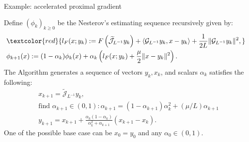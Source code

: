 \documentclass[11pt]{beamer}
\begin{document}
        \begin{frame}{Example: accelerated proximal gradient}
            \begin{definition}
                \label{def:nes-est-seq-pg}
                {\small
                    Define $(\phi_k)_{k \ge0}$ be the Nesterov's estimating sequence recursively given by: 
                    \begin{align*}
                        &\textcolor{red}{
                            l_F(x; y_k) := 
                            F\left(\widetilde{\mathcal J}_{L^{-1}} y_k \right) 
                            + \langle \mathcal G_{L^{-1}}y_k, x - y_k\rangle + 
                            \frac{1}{2L}\Vert \mathcal G_{L^{-1}}y_k\Vert^2,
                        } 
                        \\
                        & 
                        \phi_{k + 1}(x)
                        := (1 - \alpha_k)\phi_k (x) + 
                        \alpha_k 
                        \left(
                            l_F(x; y_k) + \frac{\mu}{2}\Vert x - y_k\Vert^2
                        \right). 
                    \end{align*}
                    The Algorithm generates a sequence of vectors $y_k, x_k$, and scalars $\alpha_k$ satisfies the following: 
                    \begin{align*}
                        &x_{k + 1} = \widetilde{\mathcal J}_{L^{-1}} y_k, 
                        \\
                        & \text{find } \alpha_{k + 1} \in (0, 1): 
                        \alpha_{k + 1} = (1 - \alpha_{k + 1})\alpha_k^{2} + (\mu/L) \alpha_{k + 1}
                        \\
                        &y_{k + 1} = x_{k + 1} + \frac{\alpha_k(1 - \alpha_k)}{\alpha_k^2 + \alpha_{k + 1}}(x_{k + 1} - x_k). 
                    \end{align*}
                    One of the possible base case can be $x_0 = y_0$ and any $\alpha_0 \in (0, 1)$. 
                }
            \end{definition}
        \end{frame}
\end{document}
